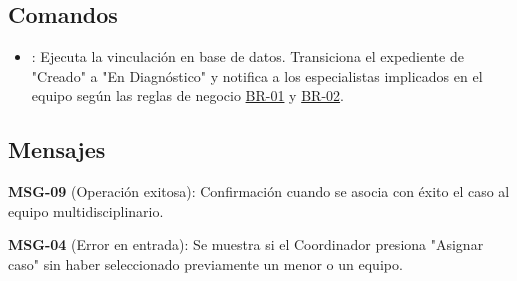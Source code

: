 \subsection{Comandos}
	\begin{itemize}
		\item {}: Ejecuta la vinculación en base de datos. Transiciona el expediente de "Creado" a "En Diagnóstico" y notifica a los especialistas implicados en el equipo según las reglas de negocio \hyperlink{BR-01}{BR-01} y \hyperlink{BR-02}{BR-02}.
	\end{itemize}

\subsection{Mensajes}
	\begin{Citemize}
		\item {\bf MSG-09} (Operación exitosa): Confirmación cuando se asocia con éxito el caso al equipo multidisciplinario.
		\item {\bf MSG-04} (Error en entrada): Se muestra si el Coordinador presiona "Asignar caso" sin haber seleccionado previamente un menor o un equipo.
	\end{Citemize}
